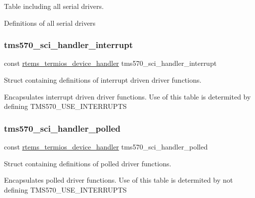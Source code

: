 Table including all serial drivers. 

Definitions of all serial drivers \mbox{\label{tms570-sci-driver_8h_afc72c833e5a0309b5716223987446713}} 
\subsubsection{\texorpdfstring{tms570\_sci\_handler\_interrupt}{tms570\_sci\_handler\_interrupt}}
{\footnotesize\ttfamily const \mbox{\hyperlink{structrtems__termios__device__handler}{rtems\+\_\+termios\+\_\+device\+\_\+handler}} tms570\+\_\+sci\+\_\+handler\+\_\+interrupt}



Struct containing definitions of interrupt driven driver functions. 

Encapsulates interrupt driven driver functions. Use of this table is determited by defining T\+M\+S570\+\_\+\+U\+S\+E\+\_\+\+I\+N\+T\+E\+R\+R\+U\+P\+TS \mbox{\label{tms570-sci-driver_8h_a2f9036d4d7c7c5dcb9068422928da97a}} 
\subsubsection{\texorpdfstring{tms570\_sci\_handler\_polled}{tms570\_sci\_handler\_polled}}
{\footnotesize\ttfamily const \mbox{\hyperlink{structrtems__termios__device__handler}{rtems\+\_\+termios\+\_\+device\+\_\+handler}} tms570\+\_\+sci\+\_\+handler\+\_\+polled}



Struct containing definitions of polled driver functions. 

Encapsulates polled driver functions. Use of this table is determited by not defining T\+M\+S570\+\_\+\+U\+S\+E\+\_\+\+I\+N\+T\+E\+R\+R\+U\+P\+TS 
